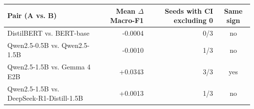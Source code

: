 \begin{tabular}{@{}lrrc@{}}
\toprule
Pair (A vs. B) & Mean $\Delta$ Macro-F1 & Seeds with CI excluding 0 & Same sign \\
\midrule
DistilBERT vs. BERT-base & -0.0004 & 0/3 & no \\
Qwen2.5-0.5B vs. Qwen2.5-1.5B & -0.0010 & 1/3 & no \\
Qwen2.5-1.5B vs. Gemma 4 E2B & +0.0343 & 3/3 & yes \\
Qwen2.5-1.5B vs. DeepSeek-R1-Distill-1.5B & +0.0013 & 1/3 & no \\
\bottomrule
\end{tabular}
